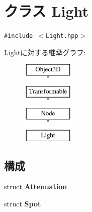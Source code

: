 \hypertarget{classm3g_1_1Light}{
\section{クラス Light}
\label{classm3g_1_1Light}
}
{\tt \#include $<$Light.hpp$>$}

Lightに対する継承グラフ:\begin{figure}[H]
\begin{center}
\leavevmode
\includegraphics[height=4cm]{classm3g_1_1Light}
\end{center}
\end{figure}
\subsection*{構成}
\begin{CompactItemize}
\item 
struct \textbf{Attenuation}
\item 
struct \textbf{Spot}
\end{CompactItemize}
